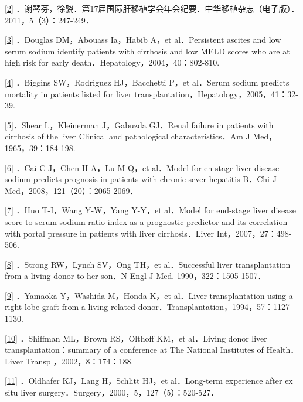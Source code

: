 \protect\hyperlink{text00020.htmlux5cux23ch2-19-back}{{[}2{]}}
．谢琴芬，徐骁．第17届国际肝移植学会年会纪要．中华移植杂志（电子版）．2011，5（3）：247-249．

\protect\hyperlink{text00020.htmlux5cux23ch3-19-back}{{[}3{]}} ．Douglas
DM，Abouass Ia，Habib A，et al．Persistent ascites and low serum sodium
identify patients with cirrhosis and low MELD scores who are at high
risk for early death．Hepatology，2004，40：802-810.

\protect\hyperlink{text00020.htmlux5cux23ch4-19-back}{{[}4{]}} ．Biggins
SW，Rodriguez HJ，Bacchetti P，et al．Serum sodium predicts mortality in
patients listed for liver transplantation，Hepatology，2005，41：32-39.

{[}5{]}．Shear L，Kleinerman J，Gabuzda GJ．Renal failure in patients
with cirrhosis of the liver Clinical and pathological
characteristics．Am J Med，1965，39：184-198.

\protect\hyperlink{text00020.htmlux5cux23ch6-19-back}{{[}6{]}} ．Cai
C-J，Chen H-A，Lu M-Q，et al．Model for en-stage liver disease-sodium
predicts prognosis in patients with chronic sever hepatitis B．Chi J
Med，2008，121（20）：2065-2069．

\protect\hyperlink{text00020.htmlux5cux23ch7-19-back}{{[}7{]}} ．Huo
T-I，Wang Y-W，Yang Y-Y，et al．Model for end-stage liver disease score
to serum sodium ratio index as a prognostic predictor and its
correlation with portal pressure in patients with liver cirrhosis．Liver
Int，2007，27：498-506.

\protect\hyperlink{text00020.htmlux5cux23ch8-19-back}{{[}8{]}} ．Strong
RW，Lynch SV，Ong TH，et al．Successful liver transplantation from a
living donor to her son．N Engl J Med. 1990，322：1505-1507．

\protect\hyperlink{text00020.htmlux5cux23ch9-19-back}{{[}9{]}} ．Yamaoka
Y，Washida M，Honda K，et al．Liver transplantation using a right lobe
graft from a living related donor．Transplantation，1994，57：1127-1130.

\protect\hyperlink{text00020.htmlux5cux23ch10-19-back}{{[}10{]}}
．Shiffman ML，Brown RS，Olthoff KM，et al．Living donor liver
transplantation：summary of a conference at The National Institutes of
Health．Liver Transpl，2002，8：174：188.

\protect\hyperlink{text00020.htmlux5cux23ch11-19-back}{{[}11{]}}
．Oldhafer KJ，Lang H，Schlitt HJ，et al．Long-term experience after ex
situ liver surgery．Surgery，2000，5，127（5）：520-527．

